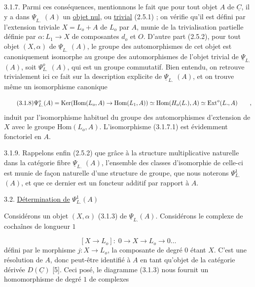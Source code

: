 3.1.7.  Parmi ces conséquences, mentionnons le fait que pour tout objet $A$ de $\underline{C}$, il y a dans $\underline{\Psi}_{L.}$ $(A)$ un \underline{objet nul}, ou \underline{trivial} (2.5.1) ; on vérifie qu'il est défini par l'extension triviale $X = L_o + A$ de $L_o$ par $A$, munie de la trivialisation partielle définie par $\alpha : L_1 \longrightarrow X$ de composantes $d_o$ et $O$. D'autre part (2.5.2), pour tout objet $(X,\alpha)$ de $\underline{\Psi}_{L.}$ $(A)$, le groupe des automorphismes de cet objet est canoniquement isomorphe au groupe des automorphismes de l'objet trivial de $\underline{\Psi}_{L.}$ $(A)$, soit $\Psi^{o}_{L.}$ $(A)$, qui est un groupe commutatif. Bien entendu, on retrouve trivialement ici ce fait sur la description explicite de $\underline{\Psi}_{L.}$ $(A)$, et on trouve même un isomorphisme canonique

\begin{equation}\tag{3.1.8}
\Psi^{o}_{L.} (A) = \mathrm{Ker}(\mathrm{Hom}(L_o,A) \to \mathrm{Hom}(L_1,A)) \simeq \mathrm{Hom}(H_o(L.),A) \\ \simeq \mathrm{Ext}^{o}(L.,A) \qquad ,
\end{equation}
induit par l'isomorphisme habituel du groupe des automorphismes d'extension de $X$ avec le groupe $\mathrm{Hom}(L_o,A)$. L'isomorphisme (3.1.7.1) est évidemment fonctoriel en $A$.

3.1.9.  Rappelons enfin (2.5.2) que grâce à la structure multiplicative naturelle dans la catégorie fibre $\underline{\Psi}_{L.}$ $(A)$, l'ensemble des classes d'isomorphie de celle-ci est munie de façon naturelle d'une structure de groupe, que nous noterons $\Psi^{1}_{L.}$ $(A)$, et que ce dernier est un foncteur additif par rapport à $A$.




3.2. \underline{Détermination de} $\Psi^1_{L.} (A)$

Considérons un objet $(X,\alpha)$ (3.1.3) de $\underline{\Psi}_{L.} (A)$. Considérons le complexe de cochaînes de longueur $1$

\begin{equation}\tag{3.2.1}
[X \to L_o] : \; 0 \longrightarrow X \longrightarrow L_o \longrightarrow 0 \ldots
\end{equation}
défini par le morphisme $j : X \longrightarrow L_o$, la composante de degré $0$ étant $X$. C'est une résolution de $A$, donc peut-être identifié à $A$ en tant qu'objet de la catégorie dérivée $D(\underline{C})$ [5]. Ceci posé, le diagramme (3.1.3) nous fournit un homomorphisme de degré $1$ de complexes

